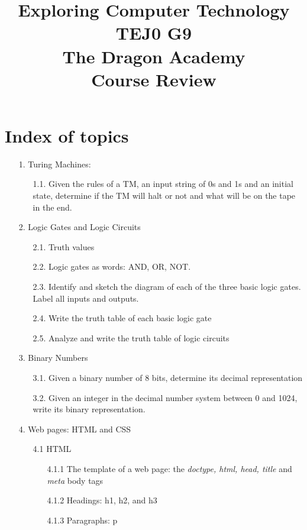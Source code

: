 \documentclass{article}
\title{Exploring Computer Technology TEJ0 G9 \\
The Dragon Academy \\
Course Review }
\begin{document}
\maketitle


\section{Index of topics}
\begin{enumerate}
\item[ 1.] Turing Machines:

	\begin{enumerate}
	\item[ 1.1.] Given the rules of a TM, an input string of 0s and 1s and an initial state,
	        determine if the TM will halt or not and what will be on the tape in the end.
	\end{enumerate}
\item[ 2.] Logic Gates and Logic Circuits
	\begin{enumerate}
	\item[ 2.1.] Truth values
	\item[ 2.2.] Logic gates as words: AND, OR, NOT.
	\item[ 2.3.] Identify and sketch the diagram of each of the three basic logic gates. Label all inputs and outputs.
	\item[ 2.4.] Write the truth table of each basic logic gate
	\item[ 2.5.] Analyze and write the truth table of logic circuits
	\end{enumerate}
\item[ 3.] Binary Numbers
	\begin{enumerate}
	\item[ 3.1.] Given a binary number of 8 bits, determine its decimal representation
	\item[ 3.2.] Given an integer in the decimal number system between 0 and 1024,
	     write its binary representation.
	\end{enumerate}
\item[4.] Web pages: HTML and CSS
	\begin{enumerate}
	\item[4.1] HTML
		\begin{enumerate}
		\item[4.1.1] The template of a web page: the {\sl doctype, html, head, title} and {\sl meta} body tags
		\item[4.1.2] Headings: h1, h2, and h3 
		\item[4.1.3] Paragraphs: p

\end{enumerate}
\end{enumerate}
\end{enumerate}
\end{document}
